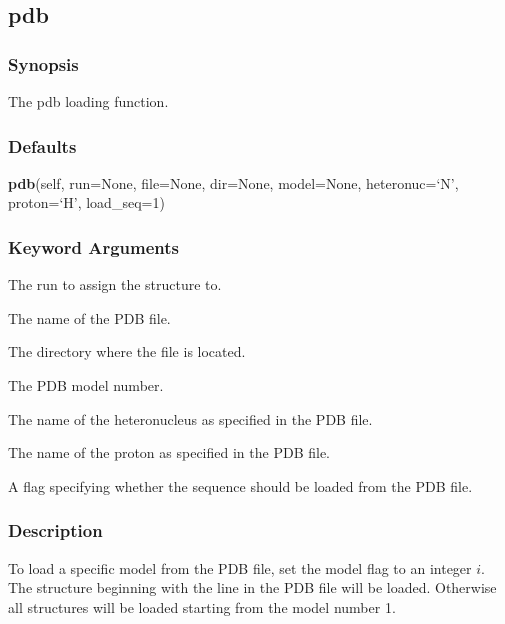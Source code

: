 \newpage

\subsection{pdb}


\subsubsection{Synopsis}

The pdb loading function.



\subsubsection{Defaults}

\textsf{\textbf{pdb}(self, run=None, file=None, dir=None, model=None, heteronuc=`N', proton=`H', load\_seq=1)}


\subsubsection{Keyword Arguments}

  The run to assign the structure to. 

  The name of the PDB file. 

  The directory where the file is located. 

  The PDB model number. 

  The name of the heteronucleus as specified in the PDB file. 

  The name of the proton as specified in the PDB file. 

  A flag specifying whether the sequence should be loaded from the PDB file. 




\subsubsection{Description}

To load a specific model from the PDB file, set the model flag to an integer $i$.  The structure beginning with the line  in the PDB file will be loaded.  Otherwise all structures will be loaded starting from the model number 1.


